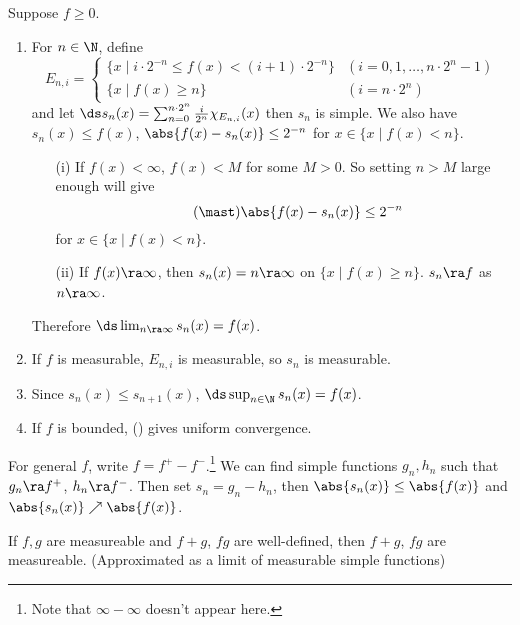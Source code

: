 \pf Suppose \(f \geq 0\).
\begin{enumerate}
    \item For \(n \in \N\), define
          \[
              E_{n, i} = \begin{cases}
                  \{x \mid i\cdot 2^{-n} \leq f(x) < (i+1)\cdot 2^{-n}\} & (i = 0, 1, \dots, n\cdot 2^n - 1) \\
                  \{x \mid f(x) \geq n\}                                 & (i = n\cdot 2^n)
              \end{cases}
          \]
          and let \(\ds s_n(x) = \sum_{n=0}^{n\cdot 2^n} \frac{i}{2^n} \chi_{E_{n, i}} (x)\) then \(s_n\) is simple. We also have \(s_n(x) \leq f(x)\), \(\abs{f(x) - s_n(x)} \leq 2^{-n}\) for \(x \in \{x \mid f(x) < n\}\).
          \begin{enumerate}
              \item[(i)] If \(f(x) < \infty\), \(f(x)< M\) for some \(M > 0\). So setting \(n > M\) large enough will give
                  \[ \tag{\mast}
                      \abs{f(x) - s_n(x)} \leq 2^{-n}
                  \]
                  for \(x \in \{x \mid f(x) < n\}\).
              \item[(ii)] If \(f(x) \ra\infty\), then \(s_n(x) = n \ra \infty\) on \(\{x \mid f(x) \geq n\}\). \(s_n \ra f\) as \(n \ra \infty\).
          \end{enumerate}
          Therefore \(\ds \lim_{n \ra \infty} s_n(x) = f(x)\).

    \item If \(f\) is measurable, \(E_{n, i}\) is measurable, so \(s_n\) is measurable.

    \item Since \(s_n(x) \leq s_{n+1}(x)\), \(\ds \sup_{n\in \N} s_n(x) = f(x)\).

    \item If \(f\) is bounded, (\mast) gives uniform convergence.
\end{enumerate}

For general \(f\), write \(f = f^+ - f^-\).\footnote{Note that \(\infty - \infty\) doesn't appear here.} We can find simple functions \(g_n, h_n\) such that \(g_n \ra f^+\), \(h_n \ra f^-\). Then set \(s_n = g_n - h_n\), then \(\abs{s_n(x)} \leq \abs{f(x)}\) and \(\abs{s_n(x)} \nearrow \abs{f(x)}\).

\cor If \(f, g\) are measureable and \(f + g\), \(fg\) are well-defined, then \(f+g\), \(fg\) are measureable. (Approximated as a limit of measurable simple functions)

\pagebreak
